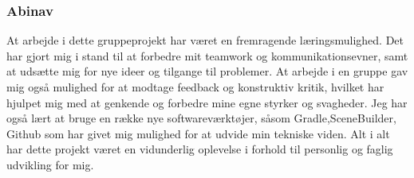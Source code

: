 \subsubsection{Abinav}\label{AA}
At arbejde i dette gruppeprojekt har været en fremragende læringsmulighed. Det har gjort mig i stand til at forbedre mit teamwork og kommunikationsevner, samt at udsætte mig for nye ideer og tilgange til problemer. At arbejde i en gruppe gav mig også mulighed for at modtage feedback og konstruktiv kritik, hvilket har hjulpet mig med at genkende og forbedre mine egne styrker og svagheder. Jeg har også lært at bruge en række nye softwareværktøjer, såsom Gradle,SceneBuilder, Github som har givet mig mulighed for at udvide min tekniske viden. Alt i alt har dette projekt været en vidunderlig oplevelse i forhold til personlig og faglig udvikling for mig.

